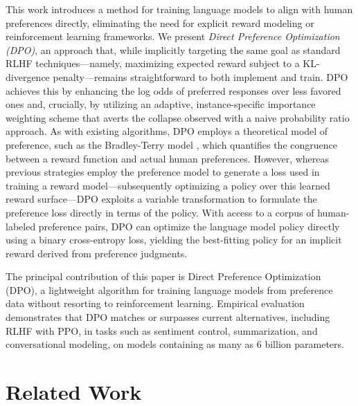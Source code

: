 This work introduces a method for training language models to align with human preferences directly, eliminating the need for explicit reward modeling or reinforcement learning frameworks. We present \textit{{Direct Preference Optimization} (DPO)}, an approach that, while implicitly targeting the same goal as standard RLHF techniques—namely, maximizing expected reward subject to a KL-divergence penalty—remains straightforward to both implement and train. DPO achieves this by enhancing the log odds of preferred responses over less favored ones and, crucially, by utilizing an adaptive, instance-specific importance weighting scheme that averts the collapse observed with a naive probability ratio approach. As with existing algorithms, DPO employs a theoretical model of preference, such as the Bradley-Terry model \cite{bradley1952rankanalysis}, which quantifies the congruence between a reward function and actual human preferences. However, whereas previous strategies employ the preference model to generate a loss used in training a reward model—subsequently optimizing a policy over this learned reward surface—DPO exploits a variable transformation to formulate the preference loss directly in terms of the policy. With access to a corpus of human-labeled preference pairs, DPO can optimize the language model policy directly using a binary cross-entropy loss, yielding the best-fitting policy for an implicit reward derived from preference judgments.

The principal contribution of this paper is Direct Preference Optimization (DPO), a lightweight algorithm for training language models from preference data without resorting to reinforcement learning. Empirical evaluation demonstrates that DPO matches or surpasses current alternatives, including RLHF with PPO, in tasks such as sentiment control, summarization, and conversational modeling, on models containing as many as 6 billion parameters.

\section{Related Work}

